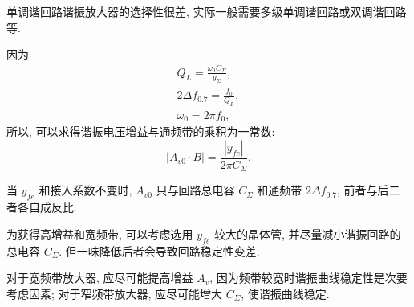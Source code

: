 单调谐回路谐振放大器的选择性很差, 实际一般需要多级单调谐回路或双调谐回路等.

因为
\begin{gather*}
    Q_L=\frac{\omega_0C_\Sigma}{g_\Sigma}, \\
    2\Delta f_{0.7}=\frac{f_0}{Q_L}, \\
    \omega_0=2\pi f_0,
\end{gather*}
所以, 可以求得谐振电压增益与通频带的乘积为一常数:
\begin{equation}
    |A_{v0}\cdot B|=\frac{|y_{fe}|}{2\pi C_\Sigma}.
\end{equation}

\noindent\hrulefill

当 $y_{fe}$ 和接入系数不变时, $A_{v0}$ 只与回路总电容 $C_\Sigma$ 和通频带 $2\Delta f_{0.7}$, 前者与后二者各自成反比.

为获得高增益和宽频带, 可以考虑选用 $y_{fe}$ 较大的晶体管, 并尽量减小谐振回路的总电容 $C_\Sigma$. 但一味降低后者会导致回路稳定性变差.

对于宽频带放大器, 应尽可能提高增益 $A_v$, 因为频带较宽时谐振曲线稳定性是次要考虑因素; 对于窄频带放大器, 应尽可能增大 $C_\Sigma$, 使谐振曲线稳定.


